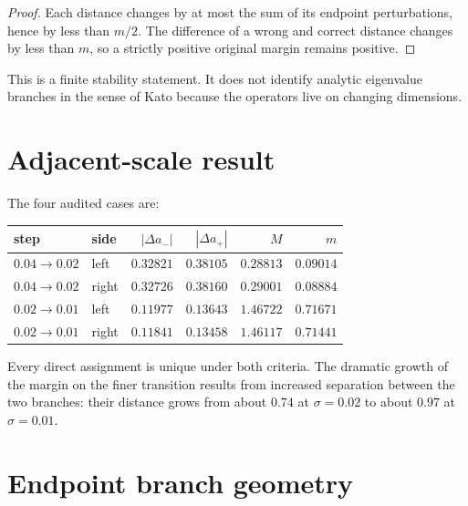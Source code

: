 \documentclass[12pt]{article}
\theoremstyle{remark}\newtheorem{remark}[theorem]{Remark}
\begin{document}
\begin{proof}
Each distance changes by at most the sum of its endpoint perturbations,
hence by less than $m/2$.  The difference of a wrong and correct distance
changes by less than $m$, so a strictly positive original margin remains
positive.
\end{proof}

This is a finite stability statement.  It does not identify analytic
eigenvalue branches in the sense of Kato \citep{Kato1995} because the
operators live on changing dimensions.

\section{Adjacent-scale result}

The four audited cases are:
\begin{center}
\small
\begin{tabular}{llrrrr}
\toprule
step & side & $|\Delta a_-|$ & $|\Delta a_+|$ & $M$ & $m$\\
\midrule
$0.04\to0.02$ & left  & $0.32821$ & $0.38105$ & $0.28813$ & $0.09014$\\
$0.04\to0.02$ & right & $0.32726$ & $0.38160$ & $0.29001$ & $0.08884$\\
$0.02\to0.01$ & left  & $0.11977$ & $0.13643$ & $1.46722$ & $0.71671$\\
$0.02\to0.01$ & right & $0.11841$ & $0.13458$ & $1.46117$ & $0.71441$\\
\bottomrule
\end{tabular}
\end{center}
Every direct assignment is unique under both criteria.  The dramatic growth
of the margin on the finer transition results from increased separation
between the two branches: their distance grows from about $0.74$ at
$\sigma=0.02$ to about $0.97$ at $\sigma=0.01$.

\section{Endpoint branch geometry}
\end{document}
